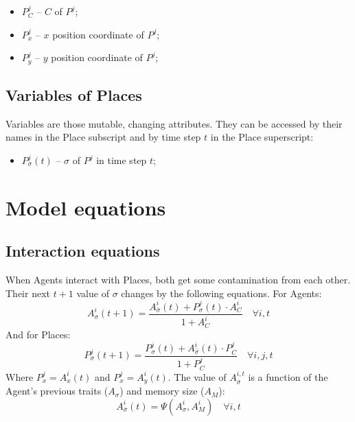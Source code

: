 \documentclass{article}
\begin{document}
\begin{itemize}
    \item $P^{j}_{C}$ -- $C$ of $P^{j}$;
    \item $P^{j}_{x}$ -- $x$ position coordinate of $P^{j}$;
    \item $P^{j}_{y}$ -- $y$ position coordinate of $P^{j}$;
\end{itemize}

\subsection{Variables of Places}

\par Variables are those mutable, changing attributes. They can be accessed by their names in the Place subscript and by time step $t$ in the Place superscript: 

\begin{itemize}
    \item $P^{j}_{\sigma}(t)$ -- $\sigma$ of $P^{j}$ in time step $t$;
\end{itemize}

\section{Model equations}

\subsection{Interaction equations}

\par When Agents interact with Places, both get some contamination from each other. Their next $t+1$ value of $\sigma$ changes by the following equations. For Agents:  
\begin{equation}
    A^{i}_{\sigma}(t + 1) = \frac{A^{i}_{\bar{\sigma}}(t) + P^{j}_{\sigma}(t) \cdot A^{i}_{C}}{1 + A^{i}_{C}} \quad \forall i, t
\end{equation}
And for Places:
\begin{equation}
    P^{j}_{\sigma}(t + 1) = \frac{P^{j}_{\sigma}(t) + A^{i}_{\bar{\sigma}}(t)\cdot P^{j}_{C}}{1 + P^{j}_{C}} \quad \forall i, j, t
\end{equation}
Where $P^{j}_{x} = A^{i}_{x}(t)$ and $P^{j}_{x} = A^{i}_{y}(t)$. The value of $A^{i, t}_{\bar{\sigma}}$ is a function of the Agent's previous traits ($A_{\sigma}$) and memory size ($A_M$):
\begin{equation}
    A^{i}_{\bar{\sigma}}(t) = \Psi(A^{i}_{\sigma}, A^{i}_{M}) \quad \forall i, t
\end{equation}
\end{document}
